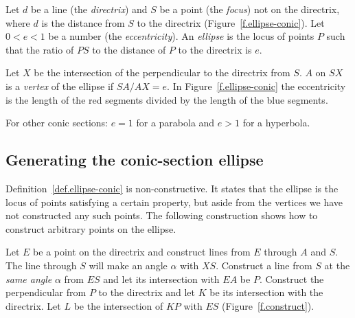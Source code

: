 \begin{definition}\label{def.ellipse-conic}
Let $d$ be a line (the \emph{directrix}) and $S$ be a point (the \emph{focus}) not on the directrix, where $d$ is the distance from $S$ to the directrix (Figure~\ref{f.ellipse-conic}). Let $0<e<1$ be a number (the \emph{eccentricity}). An \emph{ellipse} is the locus of points $P$ such that the ratio of  $PS$ to the distance of $P$ to the directrix is $e$. 

Let $X$ be the intersection of the perpendicular to the directrix from $S$. $A$ on $SX$ is a \emph{vertex} of the ellipse if $SA/AX=e$. In Figure~\ref{f.ellipse-conic} the eccentricity is the length of the red segments divided by the length of the blue segments.

For other conic sections: $e=1$ for a parabola and $e>1$ for a hyperbola.
\end{definition}


\subsection*{Generating the conic-section ellipse}

Definition~\ref{def.ellipse-conic} is non-constructive. It states that the ellipse is the locus of points satisfying a certain property, but aside from the vertices we have not constructed any such points. The following construction shows how to construct arbitrary points on the ellipse.

Let $E$ be a point on the directrix and construct lines from $E$ through $A$ and $S$. The line through $S$ will make an angle $\alpha$ with $XS$. Construct a line from $S$ at the \emph{same angle} $\alpha$ from $ES$ and let its intersection with $EA$ be $P$. Construct the perpendicular from $P$ to the directrix and let $K$ be its intersection with the directrix. Let $L$ be the intersection of $KP$ with $ES$ (Figure~\ref{f.construct}). 


